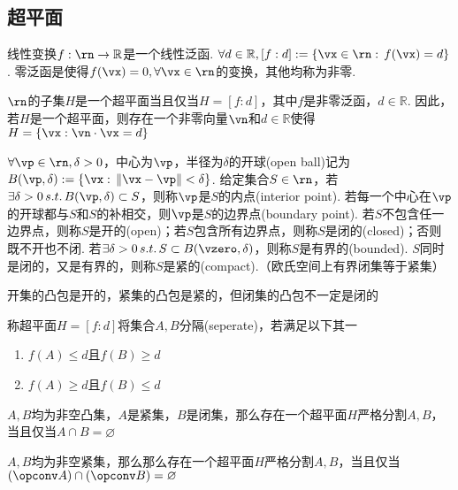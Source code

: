 \subsection{超平面}
\begin{definition}
线性变换$f:\rn\to\mathbb{R}$是一个线性泛函. $\forall d\in\mathbb{R},[f:d]:=\{\vx\in\rn:\,f(\vx)=d\}$. 零泛函是使得$f(\vx)=0,\forall\vx\in\rn$的变换，其他均称为非零.
\end{definition}
\begin{theorem}
$\rn$的子集$H$是一个超平面当且仅当$H=[f:d]$，其中$f$是非零泛函，$d\in\mathbb{R}$. 因此，若$H$是一个超平面，则存在一个非零向量$\vn$和$d\in\mathbb{R}$使得$H=\{\vx:\vn\cdot\vx=d\}$
\end{theorem}
\begin{definition}[拓扑概念]
\rm $\forall\vp\in\rn,\delta>0$，中心为$\vp$，半径为$\delta$的开球(open ball)记为$B(\vp,\delta):=\{\vx:\,\|\vx-\vp\|<\delta\}$. 给定集合$S\in\rn$，若$\exists\delta>0\,s.t.\,B(\vp,\delta)\subset S$，则称$\vp$是$S$的内点(interior point). 若每一个中心在$\vp$的开球都与$S$和$S$的补相交，则$\vp$是$S$的边界点(boundary point). 若$S$不包含任一边界点，则称$S$是开的(open)；若$S$包含所有边界点，则称$S$是闭的(closed)；否则既不开也不闭. 若$\exists\delta>0\,s.t.\,S\subset B(\vzero,\delta)$，则称$S$是有界的(bounded). $S$同时是闭的，又是有界的，则称$S$是紧的(compact).（欧氏空间上有界闭集等于紧集）
\end{definition}
\begin{theorem}
开集的凸包是开的，紧集的凸包是紧的，但闭集的凸包不一定是闭的
\end{theorem}
\begin{definition}
\rm 称超平面$H=[f:d]$将集合$A,B$分隔(seperate)，若满足以下其一
\begin{enumerate}
	\itemsep -3pt
	\item $f(A)\leq d$且$f(B)\geq d$
	\item $f(A)\geq d$且$f(B)\leq d$
\end{enumerate}
\end{definition}
\begin{theorem}
$A,B$均为非空凸集，$A$是紧集，$B$是闭集，那么存在一个超平面$H$严格分割$A,B$，当且仅当$A\cap B=\varnothing$
\end{theorem}
\begin{theorem}
$A,B$均为非空紧集，那么那么存在一个超平面$H$严格分割$A,B$，当且仅当$(\opconv A)\cap (\opconv B)=\varnothing$
\end{theorem}

